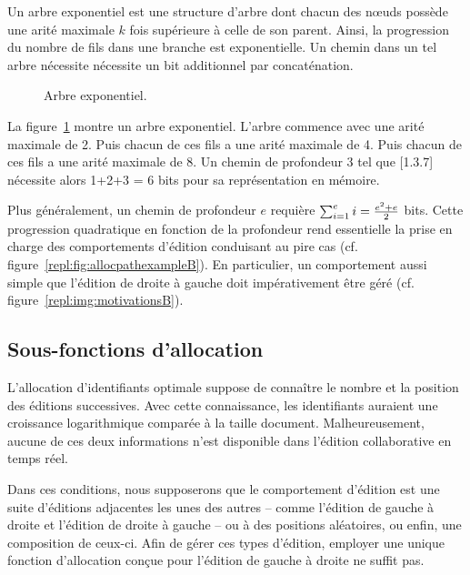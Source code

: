 Un arbre exponentiel est une structure d'arbre dont chacun des nœuds possède une
arité maximale $k$ fois supérieure à celle de son parent. Ainsi, la progression
du nombre de fils dans une branche est exponentielle. Un chemin dans un tel
arbre nécessite nécessite un bit additionnel par concaténation.

\begin{figure}
  \begin{center}
    
    \caption[Arbre exponentiel]
    {\label{repl:fig:exponentialtree}Arbre exponentiel.}
  \end{center}
\end{figure}

La figure~\ref{repl:fig:exponentialtree} montre un arbre exponentiel. L'arbre
commence avec une arité maximale de 2. Puis chacun de ces fils a une arité
maximale de 4. Puis chacun de ces fils a une arité maximale de 8. Un chemin de
profondeur 3 tel que [1.3.7] nécessite alors 1+2+3 = 6 bits pour sa
représentation en mémoire.

Plus généralement, un chemin de profondeur $e$ requière
$\textstyle\sum\nolimits_{i=1}^{e}i = {e^2 + e \over{2}}$ bits. Cette progression
quadratique en fonction de la profondeur rend essentielle la prise en charge des
comportements d'édition conduisant au pire cas
(cf. figure~\ref{repl:fig:allocpathexampleB}). En particulier, un comportement
aussi simple que l'édition de droite à gauche doit impérativement être géré
(cf. figure~\ref{repl:img:motivationsB}).

\subsection{Sous-fonctions d'allocation}
\label{repl:subsec:suballocation}

L'allocation d'identifiants optimale suppose de connaître le nombre et la
position des éditions successives. Avec cette connaissance, les identifiants
auraient une croissance logarithmique comparée à la taille
document. Malheureusement, aucune de ces deux informations n'est disponible dans
l'édition collaborative en temps réel.

Dans ces conditions, nous supposerons que le comportement d'édition est une
suite d'éditions adjacentes les unes des autres -- comme l'édition de gauche à
droite et l'édition de droite à gauche -- ou à des positions aléatoires, ou
enfin, une composition de ceux-ci. Afin de gérer ces types d'édition, employer
une unique fonction d'allocation conçue pour l'édition de gauche à droite ne
suffit pas.

